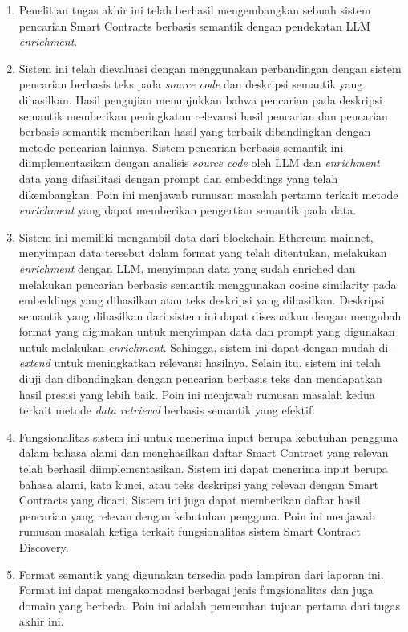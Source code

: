 \begin{enumerate}
    \item Penelitian tugas akhir ini telah berhasil mengembangkan sebuah sistem pencarian Smart Contracts berbasis semantik dengan pendekatan LLM \textit{enrichment}.
    \item Sistem ini telah dievaluasi dengan menggunakan perbandingan dengan sistem pencarian berbasis teks pada \textit{source code} dan deskripsi semantik yang dihasilkan. Hasil pengujian menunjukkan bahwa pencarian pada deskripsi semantik memberikan peningkatan relevansi hasil pencarian dan pencarian berbasis semantik memberikan hasil yang terbaik dibandingkan dengan metode pencarian lainnya. Sistem pencarian berbasis semantik ini diimplementasikan dengan analisis \textit{source code} oleh LLM dan \textit{enrichment} data yang difasilitasi dengan prompt dan embeddings yang telah dikembangkan. Poin ini menjawab rumusan masalah pertama terkait metode \textit{enrichment} yang dapat memberikan pengertian semantik pada data.
    \item Sistem ini memiliki mengambil data dari blockchain Ethereum mainnet, menyimpan data tersebut dalam format yang telah ditentukan, melakukan \textit{enrichment} dengan LLM, menyimpan data yang sudah enriched dan melakukan pencarian berbasis semantik menggunakan cosine similarity pada embeddings yang dihasilkan atau teks deskripsi yang dihasilkan. Deskripsi semantik yang dihasilkan dari sistem ini dapat disesuaikan dengan mengubah format yang digunakan untuk menyimpan data dan prompt yang digunakan untuk melakukan \textit{enrichment}. Sehingga, sistem ini dapat dengan mudah di-\textit{extend} untuk meningkatkan relevansi hasilnya. Selain itu, sistem ini telah diuji dan dibandingkan dengan pencarian berbasis teks dan mendapatkan hasil presisi yang lebih baik. Poin ini menjawab rumusan masalah kedua terkait metode \textit{data retrieval} berbasis semantik yang efektif. 
    \item Fungsionalitas sistem ini untuk menerima input berupa kebutuhan pengguna dalam bahasa alami dan menghasilkan daftar Smart Contract yang relevan telah berhasil diimplementasikan. Sistem ini dapat menerima input berupa bahasa alami, kata kunci, atau teks deskripsi yang relevan dengan Smart Contracts yang dicari. Sistem ini juga dapat memberikan daftar hasil pencarian yang relevan dengan kebutuhan pengguna. Poin ini menjawab rumusan masalah ketiga terkait fungsionalitas sistem Smart Contract Discovery.
    \item Format semantik yang digunakan tersedia pada lampiran dari laporan ini. Format ini dapat mengakomodasi berbagai jenis fungsionalitas dan juga domain yang berbeda. Poin ini adalah pemenuhan tujuan pertama dari tugas akhir ini.

\end{enumerate}
